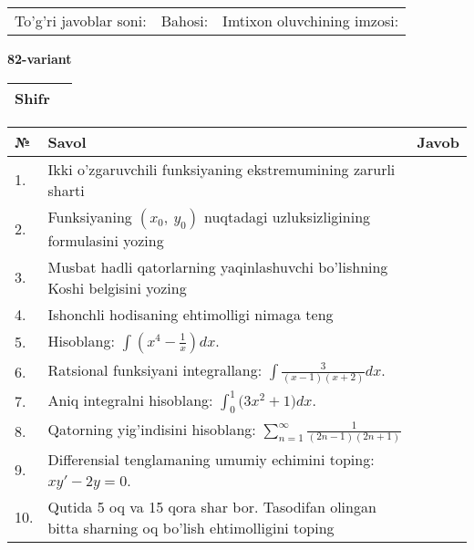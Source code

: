 \documentclass{article}
\begin{document}
  \vspace{1cm}
  
  \begin{tabular}{lll}
  To'g'ri javoblar soni: \underline{\hspace{1.5cm}} & 
  Bahosi: \underline{\hspace{1.5cm}} & 
  Imtixon oluvchining imzosi: \underline{\hspace{2cm}} \\
  \end{tabular}
  
  \egroup
  
  \newpage
  
  
  \textbf{82-variant}\\
  
  \bgroup
  \def\arraystretch{1.6} %
  
  \begin{tabular}{|m{5.7cm}|m{9.5cm}|}
  \hline
  Shifr & \\
  \hline
  \end{tabular}
  
  \vspace{1cm}
  
  \begin{tabular}{|m{0.7cm}|m{10cm}|m{4cm}|}
  \hline
  № & Savol & Javob \\
  \hline
  1. & Ikki o'zgaruvchili funksiyaning ekstremumining zarurli sharti &  \\
  \hline
  2. & Funksiyaning \((x_{0},\ y_{0})\) nuqtadagi uzluksizligining formulasini yozing &  \\
  \hline
  3. & Musbat hadli qatorlarning yaqinlashuvchi bo'lishning Koshi belgisini yozing &  \\
  \hline
  4. & Ishonchli hodisaning ehtimolligi nimaga teng &  \\
  \hline
  5. & Hisoblang: \(\int \left( x^{4} - \frac{1}{x} \right)dx\). &  \\
  \hline
  6. & Ratsional funksiyani integrallang: \(\int {\frac{3}{(x - 1)(x + 2)}dx}\). &  \\
  \hline
  7. & Aniq integralni hisoblang: \(\int_{0}^{1}{(3x^{2}} + 1)dx\). &  \\
  \hline
  8. & Qatorning yig'indisini hisoblang: \(\sum_{n = 1}^{\infty}\frac{1}{(2n - 1)(2n + 1)}\) &  \\
  \hline
  9. & Differensial tenglamaning umumiy echimini toping: \(xy' - 2y = 0\). &  \\
  \hline
  10. & Qutida 5 oq va 15 qora shar bor. Tasodifan olingan bitta sharning oq bo'lish ehtimolligini toping &  \\
  \hline
  \end{tabular}
  
\end{document}
